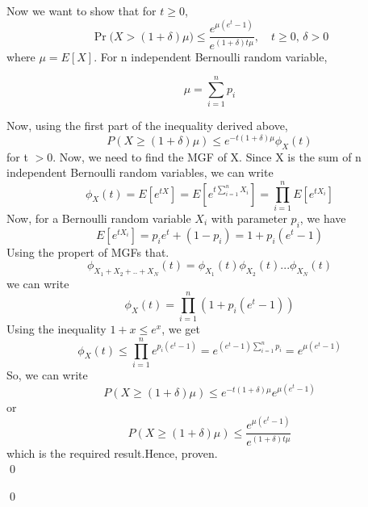 \documentclass[12pt]{article}
\newenvironment{solution}{%
  \vspace{1em}
  \noindent{\Large\bfseries Solution}\par\vspace{0.5em}
  \normalfont
}{\qed\par}
\begin{document}
\begin{solution}
\begin{solution}


Now we want to show that for $t \geq 0$,
    \[
\Pr\!\big(X > (1 + \delta)\mu \big) \leq \frac{e^{\mu(e^t - 1)}}{e^{(1+\delta)t\mu}}, 
\quad t \geq 0, \, \delta > 0
\]
where $\mu = E[X]$.
For n independent Bernoulli random variable,
 

\[
\mu = \sum_{i=1}^n p_i
\]

Now, using the first part of the inequality derived above,
\[P(X \geq (1 + \delta)\mu ) \leq e^{-t(1 + \delta)\mu} \phi _X(t)\]
for t $> 0$.
Now, we need to find the MGF of X.
Since X is the sum of n independent Bernoulli random variables, we can write
\[\phi _X(t) = E[e^{tX}] = E[e^{t\sum_{i=1}^n X_i}] = \prod_{i=1}^n E[e^{tX_i}]\]
Now, for a Bernoulli random variable $X_i$ with parameter $p_i$, we have
\[E[e^{tX_i}] = p_i e^t + (1 - p_i) = 1 + p_i(e^t - 1)\]
Using the propert of MGFs that.
\[\phi _{X_1+X_2 + .. + X_N}(t) = \phi_{X_1}(t)\phi_{X_2}(t)...\phi_{X_N}(t)\]
we can write
\[\phi _X(t) = \prod_{i=1}^n (1 + p_i(e^t - 1))\]
Using the inequality $1 + x \leq e^x$, we get
\[\phi _X(t) \leq \prod_{i=1}^n e^{p_i(e^t - 1)} = e^{(e^t - 1)\sum_{i=1}^n p_i} = e^{\mu(e^t - 1)}\]
So, we can write
\[P(X \geq (1 + \delta)\mu ) \leq e^{-t(1 + \delta)\mu} e^{\mu(e^t - 1)}\]
or
\[P(X \geq (1 + \delta)\mu ) \leq \frac{e^{\mu(e^t - 1)}}{e^{(1+\delta)t\mu}}\]
which is the required result.Hence, proven.\\



\end{solution}
\end{solution}
\end{document}

